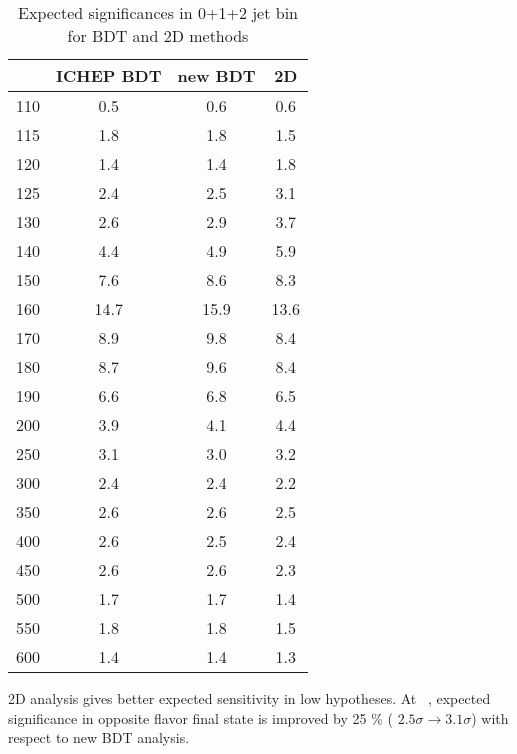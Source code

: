 \begin{table}[!htb] 
	\centering
	\begin{tabular}{c | c c c }
   	\hline \hline
	\mHi & ICHEP BDT & new BDT & 2D \\
	\hline 
	110	&0.5	&0.6	&0.6 	\\	
	115	&1.8	&1.8	&1.5	\\
	120	&1.4	&1.4	&1.8	\\
	125	&2.4	&2.5	&3.1	\\
	130	&2.6	&2.9	&3.7    \\
	140	&4.4	&4.9	&5.9    \\
	150	&7.6	&8.6	&8.3    \\
	160	&14.7	&15.9	&13.6    \\
	170	&8.9	&9.8	&8.4    \\
	180	&8.7	&9.6	&8.4    \\
	190	&6.6	&6.8	&6.5    \\
	200	&3.9	&4.1	&4.4    \\
	250	&3.1	&3.0	&3.2    \\
	300	&2.4	&2.4	&2.2    \\
	350	&2.6	&2.6	&2.5    \\
	400	&2.6	&2.5	&2.4    \\
	450	&2.6	&2.6	&2.3    \\
	500	&1.7	&1.7	&1.4    \\
	550	&1.8	&1.8	&1.5    \\
	600	&1.4	&1.4	&1.3    \\
   	\hline \hline
	\end{tabular}
	\label{tab:exp_sig_alljet}
	\caption{Expected significances in 0+1+2 jet bin for BDT and 2D methods}
\end{table}

2D analysis gives better expected sensitivity in low \mHi hypotheses. 
At \GeV~, expected significance in opposite flavor 
final state is improved by 25 \% ( $2.5 \sigma \rightarrow 3.1\sigma$) with respect to new BDT analysis. 

